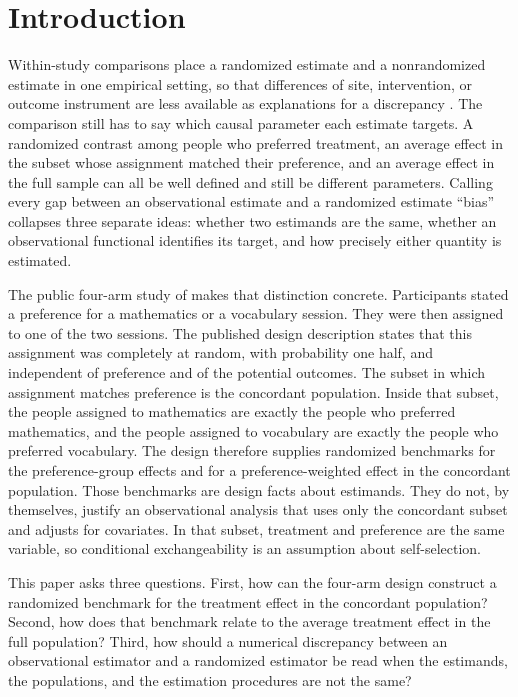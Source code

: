\documentclass[11pt]{article}
\theoremstyle{remark}
\begin{document}
\section{Introduction}
\label{sec:intro}

Within-study comparisons place a randomized estimate and a nonrandomized estimate in one empirical setting, so that differences of site, intervention, or outcome instrument are less available as explanations for a discrepancy \citep{keller2025}. The comparison still has to say which causal parameter each estimate targets. A randomized contrast among people who preferred treatment, an average effect in the subset whose assignment matched their preference, and an average effect in the full sample can all be well defined and still be different parameters. Calling every gap between an observational estimate and a randomized estimate ``bias'' collapses three separate ideas: whether two estimands are the same, whether an observational functional identifies its target, and how precisely either quantity is estimated.

The public four-arm study of \citet{keller2025} makes that distinction concrete. Participants stated a preference for a mathematics or a vocabulary session. They were then assigned to one of the two sessions. The published design description states that this assignment was completely at random, with probability one half, and independent of preference and of the potential outcomes. The subset in which assignment matches preference is the concordant population. Inside that subset, the people assigned to mathematics are exactly the people who preferred mathematics, and the people assigned to vocabulary are exactly the people who preferred vocabulary. The design therefore supplies randomized benchmarks for the preference-group effects and for a preference-weighted effect in the concordant population. Those benchmarks are design facts about estimands. They do not, by themselves, justify an observational analysis that uses only the concordant subset and adjusts for covariates. In that subset, treatment and preference are the same variable, so conditional exchangeability is an assumption about self-selection.

This paper asks three questions. First, how can the four-arm design construct a randomized benchmark for the treatment effect in the concordant population? Second, how does that benchmark relate to the average treatment effect in the full population? Third, how should a numerical discrepancy between an observational estimator and a randomized estimator be read when the estimands, the populations, and the estimation procedures are not the same?
\end{document}
